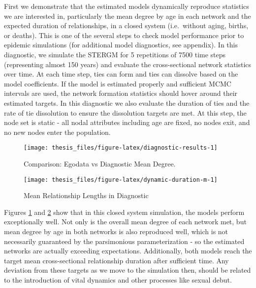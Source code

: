 \documentclass [11pt, proquest] {uwthesis}[2015/03/03]
\begin{document}
First we demonstrate that the estimated models dynamically reproduce statistics we are interested in, particularly the mean degree by age in each network and the expected duration of relationships, in a closed system (i.e.~without aging, births, or deaths). This is one of the several steps to check model performance prior to epidemic simulations (for additional model diagnostics, see appendix). In this diagnostic, we simulate the STERGM for 5 repetitions of 7500 time steps (representing almost 150 years) and evaluate the cross-sectional network statistics over time. At each time step, ties can form and ties can dissolve based on the model coefficients. If the model is estimated properly and sufficient MCMC intervals are used, the network formation statistics should hover around their estimated targets. In this diagnostic we also evaluate the duration of ties and the rate of tie dissolution to ensure the dissolution targets are met. At this step, the node set is static - all nodal attributes including age are fixed, no nodes exit, and no new nodes enter the population.
\begin{figure}

{\centering \texttt{[image: thesis\_files/figure-latex/diagnostic-results-1]} 

}

\caption{Comparison: Egodata vs Diagnostic Mean Degree.}\label{fig:diagnostic-results}
\end{figure}
\begin{figure}

{\centering \texttt{[image: thesis\_files/figure-latex/dynamic-duration-m-1]} 

}

\caption{Mean Relationship Lengths in Diagnostic}\label{fig:dynamic-duration-m}
\end{figure}
Figures \ref{fig:diagnostic-results} and \ref{fig:dynamic-duration-m} show that in this closed system simulation, the models perform exceptionally well. Not only is the overall mean degree of each network met, but mean degree by age in both networks is also reproduced well, which is not necessarily guaranteed by the parsimonious parameterization - so the estimated networks are actually exceeding expectations. Additionally, both models reach the target mean cross-sectional relationship duration after sufficient time. Any deviation from these targets as we move to the simulation then, should be related to the introduction of vital dynamics and other processes like sexual debut.
\end{document}
